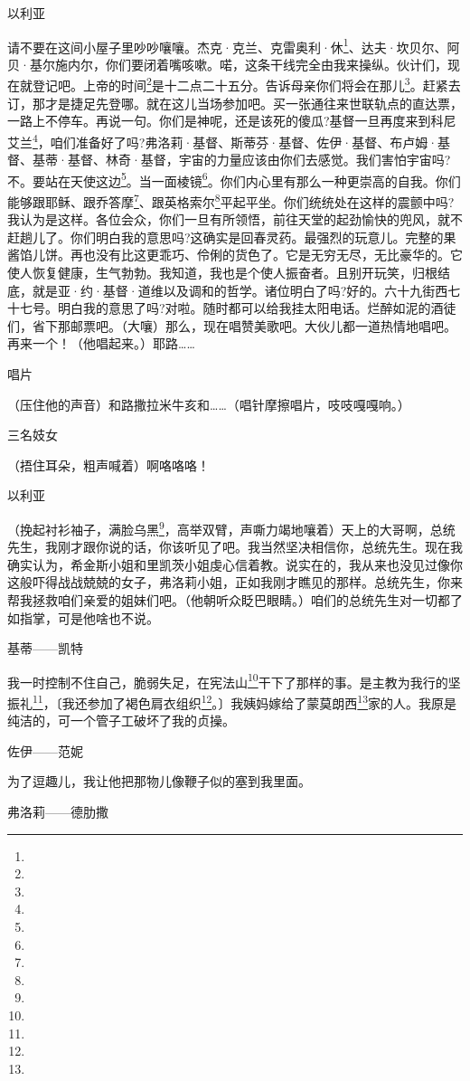 \par 以利亚
\par 请不要在这间小屋子里吵吵嚷嚷。杰克·克兰、克雷奥利·休\footnote{}、达夫·坎贝尔、阿贝·基尔施内尔，你们要闭着嘴咳嗽。喏，这条干线完全由我来操纵。伙计们，现在就登记吧。上帝的时间\footnote{}是十二点二十五分。告诉母亲你们将会在那儿\footnote{}。赶紧去订，那才是捷足先登哪。就在这儿当场参加吧。买一张通往来世联轨点的直达票，一路上不停车。再说一句。你们是神呢，还是该死的傻瓜?基督一旦再度来到科尼艾兰\footnote{}，咱们准备好了吗?弗洛莉·基督、斯蒂芬·基督、佐伊·基督、布卢姆·基督、基蒂·基督、林奇·基督，宇宙的力量应该由你们去感觉。我们害怕宇宙吗?不。要站在天使这边\footnote{}。当一面棱镜\footnote{}。你们内心里有那么一种更崇高的自我。你们能够跟耶稣、跟乔答摩\footnote{}、跟英格索尔\footnote{}平起平坐。你们统统处在这样的震颤中吗?我认为是这样。各位会众，你们一旦有所领悟，前往天堂的起劲愉快的兜风，就不赶趟儿了。你们明白我的意思吗?这确实是回春灵药。最强烈的玩意儿。完整的果酱馅儿饼。再也没有比这更乖巧、伶俐的货色了。它是无穷无尽，无比豪华的。它使人恢复健康，生气勃勃。我知道，我也是个使人振奋者。且别开玩笑，归根结底，就是亚·约·基督·道维以及调和的哲学。诸位明白了吗?好的。六十九街西七十七号。明白我的意思了吗?对啦。随时都可以给我挂太阳电话。烂醉如泥的酒徒们，省下那邮票吧。（大嚷）那么，现在唱赞美歌吧。大伙儿都一道热情地唱吧。再来一个！（他唱起来。）耶路……
\par 唱片
\par （压住他的声音）和路撒拉米牛亥和……（唱针摩擦唱片，吱吱嘎嘎响。）
\par 三名妓女
\par （捂住耳朵，粗声喊着）啊咯咯咯！
\par 以利亚
\par （挽起衬衫袖子，满脸乌黑\footnote{}，高举双臂，声嘶力竭地嚷着）天上的大哥啊，总统先生，我刚才跟你说的话，你该听见了吧。我当然坚决相信你，总统先生。现在我确实认为，希金斯小姐和里凯茨小姐虔心信着教。说实在的，我从来也没见过像你这般吓得战战兢兢的女子，弗洛莉小姐，正如我刚才瞧见的那样。总统先生，你来帮我拯救咱们亲爱的姐妹们吧。（他朝听众眨巴眼睛。）咱们的总统先生对一切都了如指掌，可是他啥也不说。
\par 基蒂——凯特
\par 我一时控制不住自己，脆弱失足，在宪法山\footnote{}干下了那样的事。是主教为我行的坚振礼\footnote{}，〔我还参加了褐色肩衣组织\footnote{}。〕我姨妈嫁给了蒙莫朗西\footnote{}家的人。我原是纯洁的，可一个管子工破坏了我的贞操。
\par 佐伊——范妮
\par 为了逗趣儿，我让他把那物儿像鞭子似的塞到我里面。
\par 弗洛莉——德肋撒
